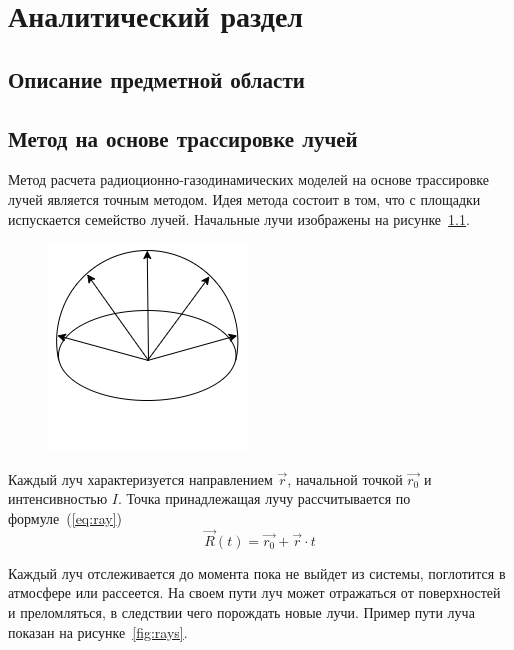 \chapter{Аналитический раздел}

\section{Описание предметной области}

\section{Метод на основе трассировке лучей}

Метод расчета радиоционно-газодинамических моделей на основе трассировке лучей является точным методом. Идея метода состоит в том, что с площадки испускается семейство лучей. Начальные лучи изображены на рисунке~\ref{fig:rays-start}. 

\begin{figure}[H]
	\centering
	\includegraphics[width=0.5\linewidth]{img/raysStart}
	\caption{}
	\label{fig:rays-start}
\end{figure}

Каждый луч характеризуется направлением $\vec{r}$, начальной точкой $\vec{r_0}$ и интенсивностью $I$. Точка принадлежащая лучу рассчитывается по формуле~(\ref{eq:ray})
\begin{equation}
   \label{eq:ray} 
   \vec{R}(t) = \vec{r_0} + \vec{r} \cdot t
\end{equation}

Каждый луч отслеживается до момента пока не выйдет из системы, поглотится в атмосфере или рассеется. На своем пути луч может отражаться от поверхностей и преломляться, в следствии чего порождать новые лучи. Пример пути луча показан на рисунке~\ref{fig:rays}.

